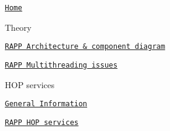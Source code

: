 \href{https://github.com/rapp-project/rapp-platform/wiki}{\tt Home}

Theory
\begin{DoxyItemize}
\item \href{https://github.com/rapp-project/rapp-platform/wiki/RAPP-Architecture}{\tt R\-A\-P\-P Architecture \& component diagram}
\item \href{https://github.com/rapp-project/rapp-platform/wiki/RAPP-Multithreading-issues}{\tt R\-A\-P\-P Multithreading issues}
\end{DoxyItemize}

H\-O\-P services
\begin{DoxyItemize}
\item \href{https://github.com/rapp-project/rapp-platform/wiki/HOP-Services---General-Information}{\tt General Information}
\item \href{https://github.com/rapp-project/rapp-platform/wiki/RAPP-HOP-services}{\tt R\-A\-P\-P H\-O\-P services}
\end{DoxyItemize}

